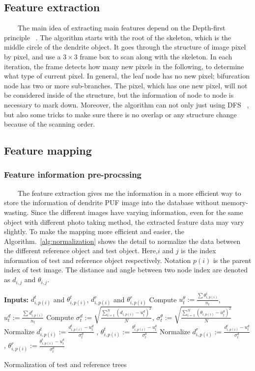\documentclass[]{article}   %
\begin{document}
\subsection{Feature extraction}
\ \ \ \ The main idea of extracting main features depend on the Depth-first principle ~\cite{tarjan1972depth}. The algorithm starts with the root of the skeleton, which is the middle circle of the dendrite object. It goes through the structure of image pixel by pixel, and use a $3 \times 3$ frame box to scan along with the skeleton. In each iteration, the frame detects how many new pixels in the following, to determine what type of current pixel. In general, the leaf node has no new pixel; bifurcation node has two or more sub-branches. The pixel, which has one new pixel, will not be considered inside of the structure, but the information of node to node is necessary to mark down. Moreover, the algorithm can not only just using DFS ~\cite{tarjan1972depth}, but also some tricks to make sure there is no overlap or any structure change because of the scanning order. 

\subsection{Feature mapping}
\subsubsection{Feature information pre-procssing}
\ \ \ \ The feature extraction gives me the information in a more efficient way to store the information of dendrite PUF image into the database without memory-wasting. Since the different images have varying information, even for the same object with different photo taking method, the extracted feature data may vary slightly. To make the mapping more efficient and easier, the Algorithm.~\ref{alg:normalization} shows the detail to normalize the data between the different reference object and test object. Here,$i$ and $j$ is the index information of test and reference object respectively. Notation $p(i)$ is the parent index of test image. The distance and angle between two node index are denoted as $d_{i,j}$ and $\theta_{i,j}$.   


\begin{algorithm}[]
	\SetAlgoLined
	\textbf{Inputs:}  $d_{i,p(i)}^t$ and $\theta_{i,p(i)}^t$, $d_{i,p(i)}^r$ and $\theta_{i,p(i)}^r$\;
	Compute $u_{t}^{\theta} := \frac{\sum \theta_{i,p(i)}^t}{n_t}$, $u_{t}^{d} := \frac{\sum d_{i,p(i)}^t}{n_t}$ \;
	Compute $\sigma_t^d := \sqrt{\frac{\sum_{i=1}^{N}\left(d_{i,p(i)}-{u_t^d}\right)^{2}}{N}}$, $\sigma_t^{\theta} := \sqrt{\frac{\sum_{i=1}^{N}\left(\theta_{i,p(i)}-{u_t^{\theta}}\right)^{2}}{N}}$ \;
	Normalize $d_{i,p(i)}^t := \frac{d_{i,p(i)}^t - u_{t}^d}{\sigma_t^d}$ , $\theta_{i,p(i)}^t := \frac{\theta_{i,p(i)}^t - u_{t}^{\theta}}{\sigma_t^{\theta}}$ \;
	Normalize $d_{i,p(i)}^r := \frac{d_{i,p(i)}^r - u_{t}^d}{\sigma_t^d}$ , $\theta_{i,p(i)}^r := \frac{\theta_{i,p(i)}^r - u_{t}^{\theta}}{\sigma_t^{\theta}}$ \;
	\caption{Normalization of test and reference trees}
	\label{alg:normalization}
\end{algorithm}
 
\end{document}
